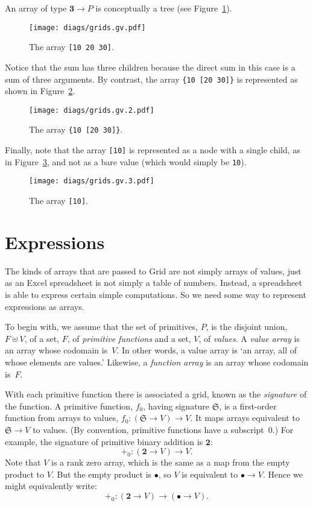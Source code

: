 \documentclass[11pt]{article}
\newcommand{\gr}[1]{\mathfrak{#1}}
\newcommand{\unit}{\bullet}
\newcommand{\three}{\mathbf{3}}
\begin{document}
An array of type $\three \to P$ is conceptually a tree (see Figure~\ref{fig:gridthree}).
\begin{figure}[ht]
  \texttt{[image: diags/grids.gv.pdf]}
  \caption{The array \texttt{[10 20 30]}.}\label{fig:gridthree}
\end{figure}
Notice that the sum has three children because the direct sum in this case is a sum of
three arguments. By contrast, the array \verb|{10 [20 30]}| is represented as
shown in Figure~\ref{fig:gridsum}.
\begin{figure}[ht]
  \texttt{[image: diags/grids.gv.2.pdf]}
  \caption{The array \texttt{\{10 [20 30]\}}.}\label{fig:gridsum}
\end{figure}
Finally, note that the array \verb|[10]| is represented as a node with a single
child, as in Figure~\ref{fig:gridsingleton}, and not as a bare value (which
would simply be \verb|10|).
\begin{figure}[ht]
  \texttt{[image: diags/grids.gv.3.pdf]}
  \caption{The array \texttt{[10]}.}\label{fig:gridsingleton}
\end{figure}


\section{Expressions}

The kinds of arrays that are passed to Grid are not simply arrays of values,
just as an Excel spreadsheet is not simply a table of numbers. Instead, a
spreadsheet is able to express certain simple computations. So we need some way
to represent expressions as arrays.

To begin with, we assume that the set of primitives, $P$, is the disjoint union,
$F \uplus V$, of a set, $F$, of \emph{primitive functions} and a set, $V$, of
\emph{values}. A \emph{value array} is an array whose codomain is~$V$. In other
words, a value array is `an array, all of whose elements are values.' Likewise,
a \emph{function array} is an array whose codomain is~$F$.

With each primitive function there is associated a grid, known as the
\emph{signature} of the function. A primitive function, $f_0$, having signature
$\gr{S}$, is a first-order function from arrays to values, $f_0: (\gr{S} \to V) \to
V$. It maps arrays equivalent to $\gr{S}\to V$ to values. (By convention,
primitive functions have a subscript~0.) For example, the signature of primitive
binary addition is $\mathbf{2}$:
\begin{equation*}
+_0: (\mathbf{2} \to V) \to V.
\end{equation*}
Note that $V$ is a rank zero array, which is the same as a map from the empty
product to $V$. But the empty product is $\unit$, so $V$ is equivalent to
$\unit\to V$. Hence we might equivalently write:
\begin{equation*}
+_0: (\mathbf{2} \to V) \to (\unit \to V).
\end{equation*}
\end{document}
